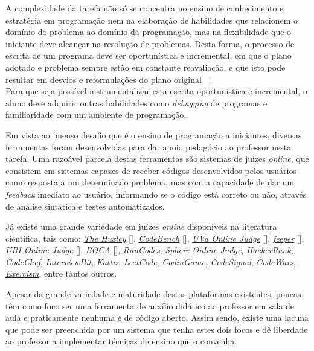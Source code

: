 A complexidade da tarefa não só se concentra no ensino de conhecimento e 
estratégia em programação nem na elaboração de habilidades que relacionem o domínio 
do problema ao domínio da programação, mas na flexibilidade que o iniciante deve 
alcançar na resolução de problemas. Desta forma, o processo de escrita 
de um programa deve  ser oportunística e incremental, em que o plano adotado 
e problema sempre estão em 
constante reavaliação, e que isto pode resultar em desvios e reformulações do plano
original \ \cite{visser1990more}. \\
Para que seja possível instrumentalizar esta escrita oportunística e incremental, 
o aluno deve adquirir outras habilidades como \emph{debugging} de programas e 
familiaridade com um ambiente de programação.

Em vista ao imenso desafio que é o ensino de programação a iniciantes, diversas ferramentas 
foram desenvolvidas para dar apoio pedagócio ao professor nesta tarefa. Uma razoável parcela 
destas ferramentas são sistemas de juízes \emph{online}, que consistem em sistemas capazes 
de receber códigos desenvolvidos pelos usuários como resposta a um determinado problema, mas 
com a capacidade de dar um \emph{feedback} imediato ao usuário, informando 
se o código está correto ou não, através de análise sintática e testes automatizados.

Já existe uma grande variedade em juízes \emph{online} disponíveis na literatura científica,
tais como: 
\hyperref[link:the_huxley]{\emph{The Huxley}} [], 
	\hyperref[link:code_bench]{\emph{CodeBench}} [],  
	\hyperref[link:uva_judge]{\emph{UVa Online Judge}} [], 
	\hyperref[link:feeper]{\emph{feeper}} [], 
	\hyperref[link:uri_judge]{\emph{URI Online Judge}} [], 
	\hyperref[link:boca]{\emph{BOCA}} [],
	\hyperref[link:we_run_codes]{\emph{RunCodes}},
	\hyperref[link:sphere_judge]{\emph{Sphere Online Judge}},
	\hyperref[link:hacker_rank]{\emph{HackerRank}}, 
	\hyperref[link:code_chef]{\emph{CodeChef}}, 
	\hyperref[link:interview_bit]{\emph{InterviewBit}}, 
	\hyperref[link:kattis]{\emph{Kattis}}, 
	\hyperref[link:leet_code]{\emph{LeetCode}}, 
	\hyperref[link:codin_game]{\emph{CodinGame}}, 
	\hyperref[link:code_signal]{\emph{CodeSignal}}, 
	\hyperref[link:code_wars]{\emph{CodeWars}}, 
	\hyperref[link:exercism]{\emph{Exercism}}, 
	entre tantos outros.

Apesar da grande variedade e maturidade destas plataformas existentes, poucas 
têm como foco ser uma ferramenta de auxílio didático ao professor em sala de aula e 
praticamente nenhuma é de código aberto. Assim sendo, existe uma lacuna que pode
ser preenchida por um sistema que tenha estes dois focos e dê liberdade ao professor 
a implementar técnicas de ensino que o convenha.



